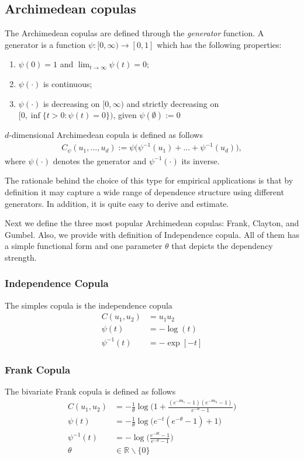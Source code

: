 \documentclass[12pt]{article}
\begin{document}
	\subsection{Archimedean copulas}
	
	The Archimedean copulas are defined through the \textit{generator} function. A generator is a function $ \psi: [0, \infty) \rightarrow [0, 1]$ which has the following properties:
	\begin{enumerate}
		\item $ \psi(0) = 1 $ and $ \lim_{t\rightarrow \infty}\psi(t) = 0 $;
		\item $ \psi(\cdot) $ is continuous;
		\item $ \psi(\cdot) $ is decreasing on $ [0, \infty) $ and strictly decreasing on $ \big[0, \inf\{t>0: \psi(t) = 0\}\big) $, given $ \psi(\emptyset) := 0 $
	\end{enumerate}
	
	$ d $-dimensional Archimedean copula is defined as follows
	\begin{align}
	C_\psi(u_1, \dots, u_d) := \psi\big(\psi^{-1}(u_1) + \dots + \psi^{-1}(u_d)\big),
	\end{align}
	where $ \psi(\cdot) $ denotes the generator and $ \psi^{-1}(\cdot) $ its inverse.
	
	The rationale behind the choice of this type for empirical applications is that by definition it may capture a wide range of dependence structure using different generators. In addition, it is quite easy to derive and estimate. 
	
	Next we define the three most popular Archimedean copulas: Frank, Clayton, and Gumbel. Also, we provide with definition of Independence copula. All of them has a simple functional form and one parameter $ \theta $ that depicts the dependency strength.
	
	\subsubsection{Independence Copula} The simples copula is the independence copula
	\begin{align}
	C(u_1, u_2) &= u_1 u_2 \\
	\psi(t) &= -\log(t) \\
	\psi^{-1}(t) &= -\exp[-t]
	\end{align}
	
	\subsubsection{Frank Copula} The bivariate Frank copula is defined as follows 
	\begin{align}
	C(u_1, u_2) &= - \frac{1}{\theta}\log\bigg(1 + \frac{(e^{-\theta u_1}-1)(e^{-\theta u_2}-1)}{e^{-\theta}-1}\bigg) \\
	\psi(t) &= -\frac{1}{\theta}\log\big(e^{-t}(e^{-\theta}-1)+1\big) \\
	\psi^{-1}(t) &= -\log\bigg(\frac{e^{-\theta t}-1}{e^{-\theta}-1}\bigg) \\
	\theta &\in \mathbb{R}\backslash \{0\}
	\end{align}
	
\end{document}
